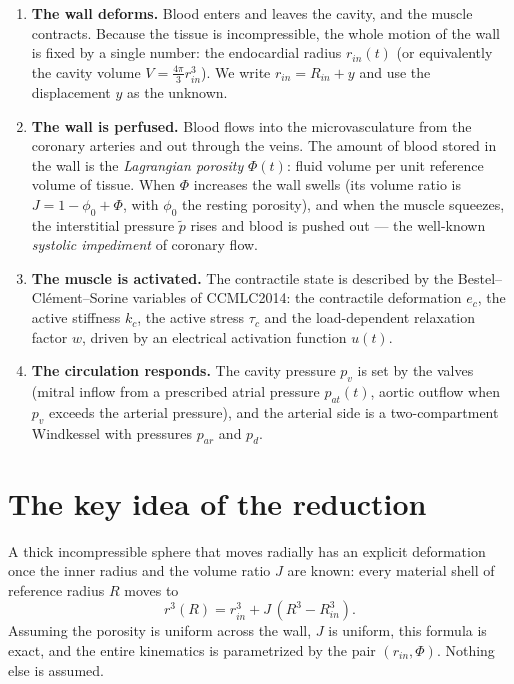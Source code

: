 \documentclass[11pt,a4paper]{article}
\newcommand{\Rin}{R_{in}}
\newcommand{\rin}{r_{in}}
\newcommand{\pf}{\tilde p}
\begin{document}
\begin{enumerate}[leftmargin=2em]
\item \textbf{The wall deforms.} Blood enters and leaves the cavity, and the muscle contracts. Because the tissue is incompressible, the whole motion of the wall is fixed by a single number: the endocardial radius $\rin(t)$ (or equivalently the cavity volume $V=\tfrac{4\pi}{3}\rin^3$). We write $\rin=\Rin+y$ and use the displacement $y$ as the unknown.
\item \textbf{The wall is perfused.} Blood flows into the microvasculature from the coronary arteries and out through the veins. The amount of blood stored in the wall is the \emph{Lagrangian porosity} $\Phi(t)$: fluid volume per unit reference volume of tissue. When $\Phi$ increases the wall swells (its volume ratio is $J=1-\phi_0+\Phi$, with $\phi_0$ the resting porosity), and when the muscle squeezes, the interstitial pressure $\pf$ rises and blood is pushed out --- the well-known \emph{systolic impediment} of coronary flow.
\item \textbf{The muscle is activated.} The contractile state is described by the Bestel--Cl\'ement--Sorine variables of CCMLC2014: the contractile deformation $e_c$, the active stiffness $k_c$, the active stress $\tau_c$ and the load-dependent relaxation factor $w$, driven by an electrical activation function $u(t)$.
\item \textbf{The circulation responds.} The cavity pressure $p_v$ is set by the valves (mitral inflow from a prescribed atrial pressure $p_{at}(t)$, aortic outflow when $p_v$ exceeds the arterial pressure), and the arterial side is a two-compartment Windkessel with pressures $p_{ar}$ and $p_d$.
\end{enumerate}

\section{The key idea of the reduction}

A thick incompressible sphere that moves radially has an explicit deformation once the inner radius and the volume ratio $J$ are known: every material shell of reference radius $R$ moves to
\[
r^3(R)=\rin^3+J\,(R^3-\Rin^3).
\]
Assuming the porosity is uniform across the wall, $J$ is uniform, this formula is exact, and the entire kinematics is parametrized by the pair $(\rin,\Phi)$. Nothing else is assumed.
\end{document}
